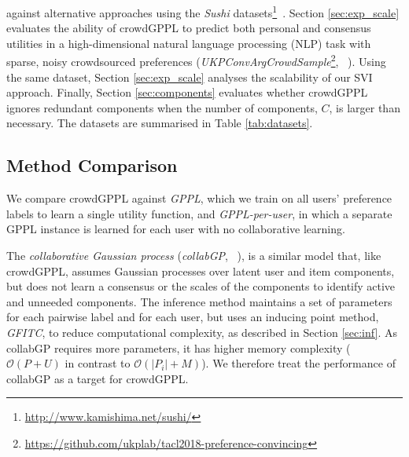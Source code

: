 against alternative approaches
using the \emph{Sushi} datasets\footnote{\url{http://www.kamishima.net/sushi/}}~\citep{kamishima2003nantonac}.
Section \ref{sec:exp_scale} evaluates 
the ability of crowdGPPL to predict both personal and consensus utilities 
in a high-dimensional
natural language processing (NLP) task
with sparse, noisy crowdsourced preferences
(\emph{UKPConvArgCrowdSample}\footnote{\url{https://github.com/ukplab/tacl2018-preference-convincing}}, ~\citet{simpson2018finding}).
Using the same dataset, Section \ref{sec:exp_scale} analyses
the scalability of our SVI approach. 
Finally, Section \ref{sec:components} evaluates whether crowdGPPL ignores redundant
components when the number of components, $C$,
is larger than necessary.
The datasets are summarised in Table \ref{tab:datasets}.

\subsection{Method Comparison}



We compare crowdGPPL against 
\emph{GPPL},
which we train on all users' preference labels to learn a single utility function,
and \emph{GPPL-per-user},
in which a separate GPPL instance is learned for each user with no collaborative
learning.

The \emph{collaborative Gaussian process} (\emph{collabGP}, ~\citet{houlsby2012collaborative}), 
is a similar model that, like crowdGPPL,
 assumes Gaussian processes over latent user and item components,
 but does not learn a consensus or the scales of the components to 
 identify active and unneeded components.
 The inference method maintains a set of parameters for each pairwise label and
 for each user, but uses an inducing point method, \emph{GFITC}, 
 to reduce computational complexity, as described in Section \ref{sec:inf}.
As collabGP requires more parameters, it has higher memory complexity 
($\mathcal{O}(P+U)$ in contrast to $\mathcal{O}(|P_i| + M)$).
We therefore treat the performance of collabGP as a target for crowdGPPL.

